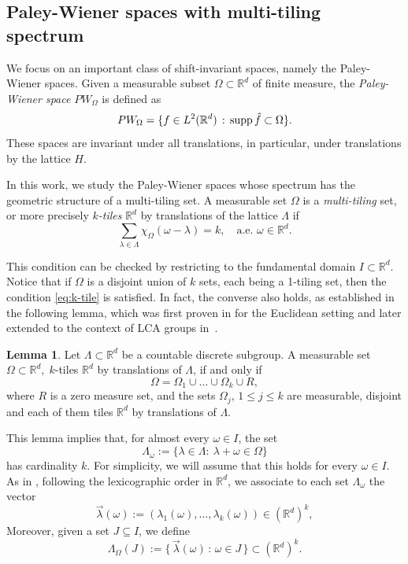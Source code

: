 \documentclass[a4paper,11pt]{amsart}
\theoremstyle{definition}
\newtheorem{lem}[fed]{Lemma}
\theoremstyle{definition}
\def\la{\lambda}
\def\La{\Lambda}
\def\w{\omega}
\def\W{\Omega}
\def\R{\mathbb{R}}
\newcommand{\supp}{{\rm supp\,}}
\begin{document}
\subsection{Paley-Wiener spaces with multi-tiling spectrum}

We focus on an important class of shift-invariant spaces, namely the Paley-Wiener spaces. Given a measurable subset $\Omega\subset \R^d$ of finite measure, the  \textit{Paley-Wiener space} $PW_{\Omega}$ is defined as 
$$PW_\Omega = \{f\in L^2(\R^d)\,:\, \supp \hat{f} \subset \Omega\}.$$
These spaces are invariant under all translations, in particular, under translations by the lattice $H$.  

In this work, we study the Paley-Wiener spaces whose spectrum has the geometric structure of a multi-tiling set. A measurable set $\Omega$ is a  \textit{multi-tiling} set, or more precisely  \textit{$k$-tiles} $\R^d$ by translations of the lattice $\La$  if
\begin{equation}\label{eq:k-tile}
	\sum_{\la\in \La} \chi_{\Omega} (\w-\la)=k,\quad  \text{a.e. } \w \in \R^d.
\end{equation}


This condition can be checked by restricting to the fundamental domain $I\subset \R^d$. Notice that if $\Omega$ is a disjoint union of $k$ sets, each being  a 1-tiling set, then the condition \eqref{eq:k-tile} is satisfied. In fact, the converse also holds, as established in the following lemma, which was first proven in \cite[Lemma 1]{Kol} for the Euclidean setting and later extended to the context of LCA groups in~\cite[Lemma 2.4]{AAC}.

\begin{lem}
	Let $\La\subset \R^d$ be  a countable discrete subgroup.
	A measurable set $\Omega\subset \R^d, \;k$-tiles $\R^d$ by  translations of $\La$,
	if and only if  $$\Omega = \Omega_1\cup\dots\cup \Omega_k\cup R,$$ where $R$ is a zero measure set, 
	and the sets $\Omega_j$,  $ 1\leq j\leq k$ are measurable, disjoint and each of them tiles $\R^d$ by translations of  $\La$.
\end{lem}

This lemma implies that, for almost every $\w\in I$, the set 
$$
\La_\w:=\{\la\in\La: \ \la+\w\in\W\}
$$
has cardinality $k$. For simplicity, we will assume that this holds for every $\w\in I$. As in \cite{CUC},  following the lexicographic order in $\R^d$, we associate to each set $\La_\w$ the vector 
$$
\vec{\la}(\w) := (\la_1(\w),\dots,\la_k(\w))\in(\R^d)^k,
$$ 
Moreover, given a set $J\subseteq I$, we define  
$$\La_\W(J) := \{\,\vec{\la}(\w)\,:\, \w\in J\, \} \subset (\R^d)^k.$$ 
\end{document}
